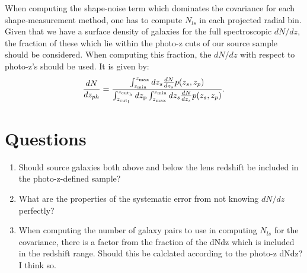 \documentclass[onecolumn,amsmath,aps,fleqn, superscriptaddress]{revtex4}
\begin{document}
When computing the shape-noise term which dominates the covariance for each shape-measurement method, one has to compute $N_{ls}$ in each projected radial bin. Given that we have a surface density of galaxies for the full spectroscopic $dN/dz$, the fraction of these which lie within the photo-z cuts of our source sample should be considered. When computing this fraction, the $dN / dz$ with respect to photo-z's should be used. It is given by:
\begin{equation}
\frac{dN}{dz_{ph}}= \frac{\int_{z_{\rm min}}^{z_{\rm max}} dz_s\frac{dN}{dz_s} p(z_s, z_p)}{\int_{z_{\rm cut_l}}^{z_{\rm cut_h}} d z_{\rm p} \int_{z_{\rm max}}^{z_{\rm min}} dz_s\frac{dN}{dz_s} p(z_s, z_p)}.
\label{dndzph}
\end{equation}

\section*{Questions}
\begin{enumerate}
\item{Should source galaxies both above and below the lens redshift be included in the photo-z-defined sample?}
\item{What are the properties of the systematic error from not knowing $dN/dz$ perfectly?}
\item{When computing the number of galaxy pairs to use in computing $N_{ls}$ for the covariance, there is a factor from the fraction of the dNdz which is included in the redshift range. Should this be calclated according to the photo-z dNdz? I think so.}
\end{enumerate}


\end{document}
